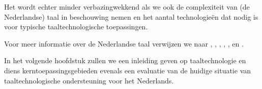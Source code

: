 \begin{multicols}{2}

    Het wordt echter minder verbazingwekkend als we ook de complexiteit van (de Nederlandse) taal in beschouwing nemen en het aantal technologie{\"e}n dat nodig is voor typische taaltechnologische toepassingen.

    Voor meer informatie over de Nederlandse taal verwijzen we naar \cite{e-ans}, \cite{TUFenW}, \cite{NedWiki:Fries}, \cite{NedWiki:Nederlands}, \cite{NedWiki:Nedersaksisch},  \cite{Ethn-Dutch} en \cite{Ethn-LN}.

\nocite{Soria:Mariani:2011} \nocite{Joscelyne:Lockwood:2003}

In het volgende hoofdstuk zullen we een inleiding geven op taaltechnologie en diens kerntoepassingsgebieden evenals een evaluatie van de huidige situatie van taaltechnologische ondersteuning voor het Nederlands.


\end{multicols}

\clearpage



